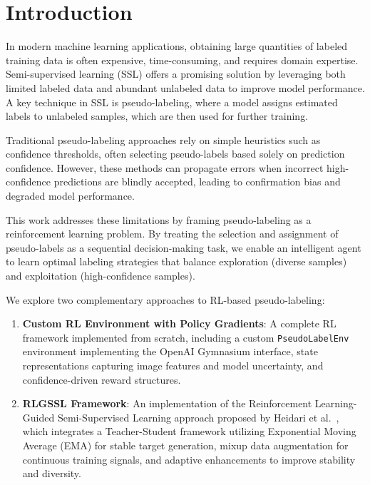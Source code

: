 \documentclass[pdflatex,sn-mathphys-num]{sn-jnl}%
\theoremstyle{thmstyleone}%
\theoremstyle{thmstyletwo}%
\theoremstyle{thmstylethree}%
\begin{document}
\section{Introduction}\label{sec1}

In modern machine learning applications, obtaining large quantities of labeled training data is often expensive, time-consuming, and requires domain expertise. Semi-supervised learning (SSL) offers a promising solution by leveraging both limited labeled data and abundant unlabeled data to improve model performance. A key technique in SSL is pseudo-labeling, where a model assigns estimated labels to unlabeled samples, which are then used for further training.

Traditional pseudo-labeling approaches rely on simple heuristics such as confidence thresholds, often selecting pseudo-labels based solely on prediction confidence. However, these methods can propagate errors when incorrect high-confidence predictions are blindly accepted, leading to confirmation bias \cite{arazo2020pseudolabelingconfirmationbiasdeep} and degraded model performance.

This work addresses these limitations by framing pseudo-labeling as a reinforcement learning problem. By treating the selection and assignment of pseudo-labels as a sequential decision-making task, we enable an intelligent agent to learn optimal labeling strategies that balance exploration (diverse samples) and exploitation (high-confidence samples).

We explore two complementary approaches to RL-based pseudo-labeling:
\begin{enumerate}
    \item \textbf{Custom RL Environment with Policy Gradients}: A complete RL framework implemented from scratch, including a custom \texttt{PseudoLabelEnv} environment implementing the OpenAI Gymnasium interface, state representations capturing image features and model uncertainty, and confidence-driven reward structures.
    \item \textbf{RLGSSL Framework}: An implementation of the Reinforcement Learning-Guided Semi-Supervised Learning approach proposed by Heidari et al.~\cite{heidari2024rlgssl}, which integrates a Teacher-Student framework utilizing Exponential Moving Average (EMA) for stable target generation, mixup data augmentation for continuous training signals, and adaptive enhancements to improve stability and diversity.
\end{enumerate}
\end{document}
